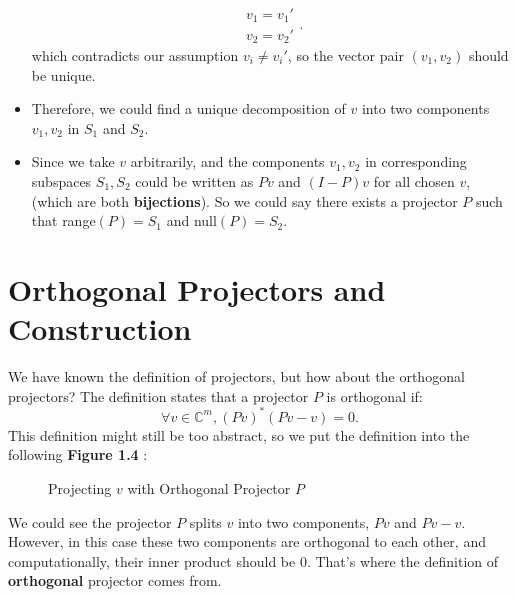 \begin{itemize}
\[      \begin{array}{l}
      v_1 = v_1' \\
      v_2 = v_2'
      \end{array}
    .\]
    which contradicts our assumption $v_i \neq v_i'$, so the vector pair $(v_1, v_2)$ should be unique.
    \item Therefore, we could find a unique decomposition of $v$ into two components $v_1, v_2$ in  $S_1$ and $S_2$. 
    \item Since we take $v$ arbitrarily, and the components  $v_1, v_2$ in corresponding subspaces $S_1, S_2$ could be written as $Pv$ and  $(I - P)v$ for all chosen $v$, (which are both \textbf{bijections}). So we could say there exists a projector  $P$ such that range$(P) = S_1$ and null$(P) = S_2$.
\end{itemize}


\section{Orthogonal Projectors and Construction}%
We have known the definition of projectors, but how about the orthogonal projectors? The definition states that a projector $P$ is orthogonal if:
\[
\forall v \in \mathbb{C}^{m}, (Pv)^{*}(Pv - v) = 0
.\] 
This definition might still be too abstract, so we put the definition into the following \textbf{Figure 1.4} :
  \begin{figure}[H]
    \centering
    \caption{Projecting $v$ with Orthogonal Projector $P$}
  \end{figure}

\noindent We could see the projector $P$ splits $v$ into two components,  $Pv$ and  $Pv - v$. However, in this case these two components are orthogonal to each other, and computationally, their inner product should be 0. That's where the definition of  \textbf{orthogonal} projector comes from. 

